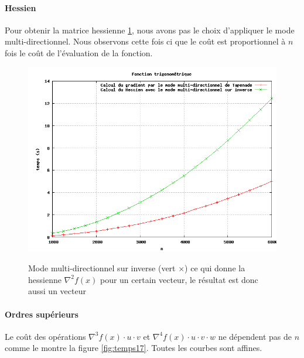 \paragraph{Hessien}

Pour obtenir la matrice hessienne \ref{fig:temps16}, nous avons pas le choix d'appliquer le mode multi-directionnel. Nous observons cette 
fois ci que le coût est proportionnel \`a $n$ fois le coût de l'\'evaluation de la fonction.


\begin{figure}
\caption{Mode multi-directionnel sur inverse (vert $\times$) ce qui donne la hessienne $\nabla^2 f(x)$ pour un certain vecteur, le r\'esultat
est donc aussi un vecteur}
\center
\includegraphics[scale=0.4]{figures/temps16.png}
\label{fig:temps16}
\end{figure}





\paragraph{Ordres sup\'erieurs}
Le coût des op\'erations $\nabla^3 f(x)\cdot u \cdot v$ et $\nabla^4f(x)\cdot u \cdot v \cdot w$ ne d\'ependent pas de $n$ comme le montre la figure
\ref{fig:temps17}. Toutes les courbes sont affines.

